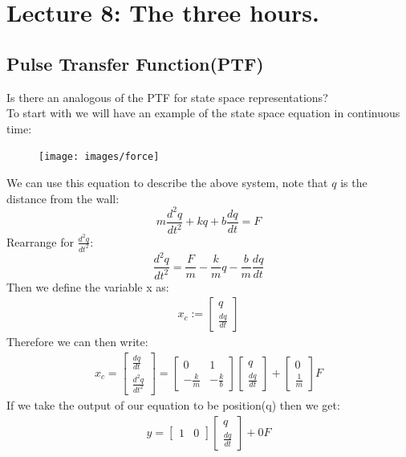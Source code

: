 \documentclass[a4paper,11pt]{article}
\begin{document}
\section{Lecture 8: The three hours.}
\subsection{Pulse Transfer Function(PTF)}
	Is there an analogous of the PTF for state space representations?\\
	To start with we will have an example of the state space equation in continuous time:
	\begin{figure}[htp]
		\centering
		\texttt{[image: images/force]}
	\end{figure}
	\FloatBarrier
	We can use this equation to describe the above system, note that $q$ is the distance from the wall:
	\begin{equation}
		m\frac{d^2q}{dt^2} + kq + b\frac{dq}{dt} = F
	\end{equation}
	Rearrange for $\frac{d^2q}{dt^2}$:
	\begin{equation}
		\frac{d^2q}{dt^2}= \frac{F}{m}- \frac{k}{m}q - \frac{b}{m}\frac{dq}{dt}
	\end{equation}
	Then we define the variable x as:
	\begin{gather}
		x_c:=
 		\begin{bmatrix} q \\ \frac{dq}{dt}\end{bmatrix}
	\end{gather}
Therefore we can then write:
\begin{gather}
	x_c=
	\begin{bmatrix} \frac{dq}{dt} \\ \frac{d^2q}{dt^2}\end{bmatrix}
 =
  \begin{bmatrix}
	0 & 1 \\
	-\frac{k}{m}& -\frac{k}{b}
   \end{bmatrix}
  \begin{bmatrix} q \\ \frac{dq}{dt}\end{bmatrix} 
  +\begin{bmatrix} 0 \\ \frac{1}{m}\end{bmatrix}F
\end{gather}
If we take the output of our equation to be position(q) then we get:
\begin{gather}
	y = \begin{bmatrix} 1 & 0\end{bmatrix}
	\begin{bmatrix} q \\ \frac{dq}{dt}\end{bmatrix} 
	+0F
\end{gather}
\end{document}
